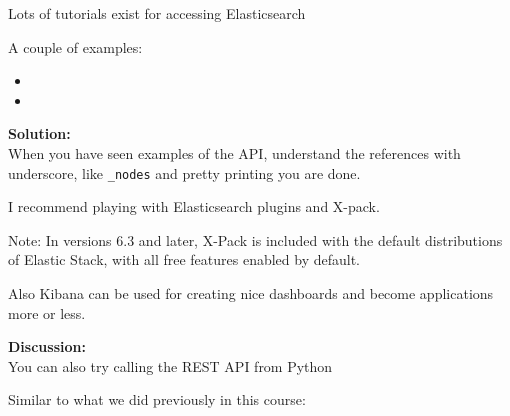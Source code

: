 \documentclass[a4paper,11pt,notitlepage]{report}
\begin{document}
Lots of tutorials exist for accessing Elasticsearch

A couple of examples:
\begin{itemize}
\item {}
\item {}
\end{itemize}

{\bf Solution:}\\
When you have seen examples of the API, understand the references with underscore, like \verb+_nodes+ and pretty printing you are done.

I recommend playing with Elasticsearch plugins and X-pack.\\

Note: In versions 6.3 and later, X-Pack is included with the default distributions of Elastic Stack, with all free features enabled by default.

Also Kibana can be used for creating nice dashboards and become applications more or less.

{\bf Discussion:}\\
You can also try calling the REST API from Python

Similar to what we did previously in this course:
\inputminted{python}{programs/rest-1.py}
\end{document}
